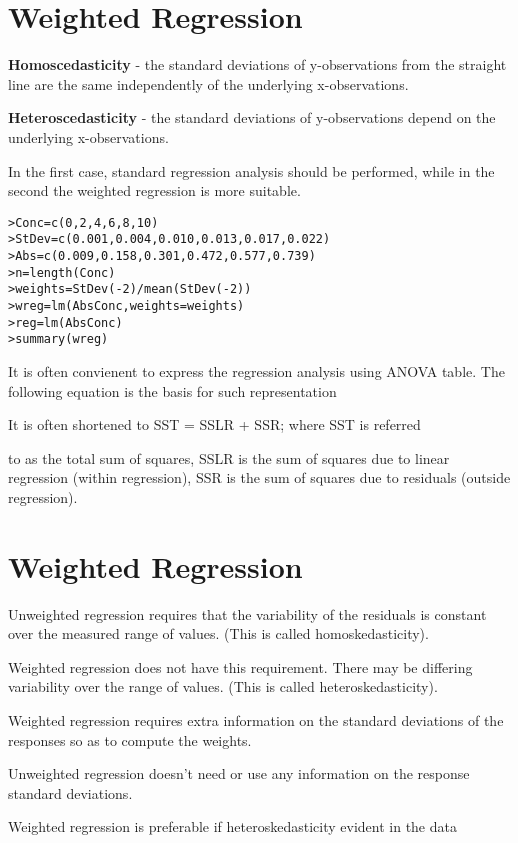 \documentclass[Master.tex]{subfiles}
\begin{document}
\section{Weighted Regression}

\textbf{Homoscedasticity} - the standard deviations of
y-observations from the straight line are the same independently
of the underlying x-observations.

\textbf{Heteroscedasticity} - the standard deviations of
y-observations depend on the underlying x-observations.

In the first case, standard regression analysis should be
performed, while in the second the weighted regression is more
suitable.

\begin{verbatim}
>Conc=c(0,2,4,6,8,10)
>StDev=c(0.001,0.004,0.010,0.013,0.017,0.022)
>Abs=c(0.009,0.158,0.301,0.472,0.577,0.739)
>n=length(Conc)
>weights=StDev(-2)/mean(StDev(-2))
>wreg=lm(AbsConc,weights=weights)
>reg=lm(AbsConc)
>summary(wreg)
\end{verbatim}


It is often convienent to express the regression analysis using
ANOVA table. The following equation is the basis for such
representation

It is often shortened to SST = SSLR + SSR; where SST is referred

to as the total sum of squares, SSLR is the sum of squares due to
linear regression (within regression), SSR is the sum of squares
due to residuals (outside regression).

\section{Weighted Regression}
Unweighted regression requires that the variability of the
residuals is constant over the measured range of values.
(This is called homoskedasticity).

Weighted regression does not have this requirement.
There may be differing variability over the range of values.
(This is called heteroskedasticity).

Weighted regression requires extra information on the standard deviations of the responses so as to compute the weights.

Unweighted regression doesn’t need or use any information on the response standard deviations.

Weighted regression is preferable if heteroskedasticity evident in the data
\end{document}
